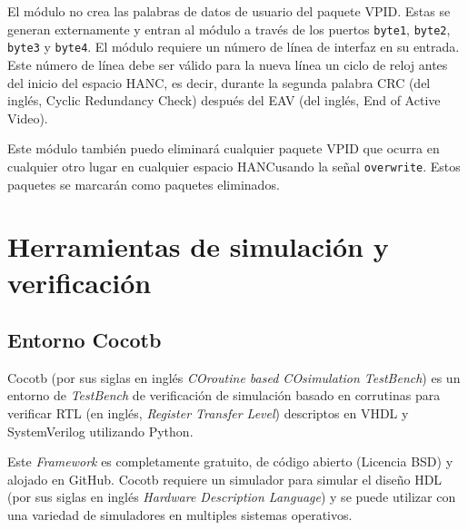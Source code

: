 El módulo no crea las palabras de datos de usuario del paquete VPID\@. Estas se
generan externamente y entran al módulo a través de los puertos \texttt{byte1},
\texttt{byte2}, \texttt{byte3} y \texttt{byte4}. El módulo requiere un número
de línea de interfaz en su entrada. Este número de línea debe ser válido para
la nueva línea un ciclo de reloj antes del inicio del espacio HANC, es decir,
durante la segunda palabra CRC  (del inglés, Cyclic Redundancy Check) después del EAV  (del inglés, End of Active Video)\@.

Este módulo también puedo eliminará cualquier paquete VPID que ocurra en
cualquier otro lugar en cualquier espacio HANC\@ usando la señal
\texttt{overwrite}. Estos paquetes se marcarán como paquetes eliminados. 




\section{Herramientas de simulación y verificación}

\subsection{Entorno Cocotb}

  Cocotb (por sus siglas en inglés \textit{COroutine based COsimulation
  TestBench}) es un entorno de \textit{TestBench} de verificación de simulación
  basado en corrutinas para verificar RTL (en inglés,
  \textit{Register Transfer Level}) descriptos en VHDL y SystemVerilog utilizando
  Python.

  Este \textit{Framework} es completamente gratuito, de código abierto (Licencia
  BSD) y alojado en GitHub. Cocotb requiere un simulador para simular el
  diseño HDL (por sus siglas en inglés \textit{Hardware Description Language}) y
  se puede utilizar con una variedad de simuladores en multiples sistemas
  operativos.


